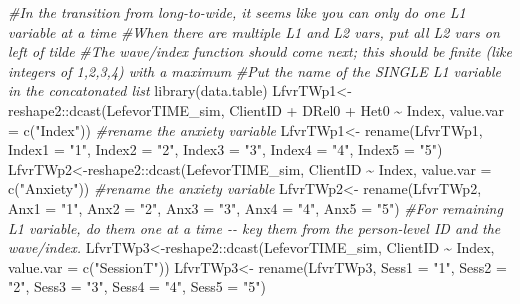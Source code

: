 \documentclass[
  11pt,
]{book}
\newenvironment{Shaded}{\begin{snugshade}}{\end{snugshade}}
\newcommand{\AttributeTok}[1]{\textcolor[rgb]{0.77,0.63,0.00}{#1}}
\newcommand{\CommentTok}[1]{\textcolor[rgb]{0.56,0.35,0.01}{\textit{#1}}}
\newcommand{\FunctionTok}[1]{\textcolor[rgb]{0.00,0.00,0.00}{#1}}
\newcommand{\NormalTok}[1]{#1}
\newcommand{\OtherTok}[1]{\textcolor[rgb]{0.56,0.35,0.01}{#1}}
\newcommand{\SpecialCharTok}[1]{\textcolor[rgb]{0.00,0.00,0.00}{#1}}
\newcommand{\StringTok}[1]{\textcolor[rgb]{0.31,0.60,0.02}{#1}}
\begin{document}
\begin{Shaded}
\begin{Highlighting}[]
\CommentTok{\#In the transition from long{-}to{-}wide, it seems like you can only do one L1 variable at a time}
\CommentTok{\#When there are multiple L1 and L2 vars, put all L2 vars on left of tilde}
\CommentTok{\#The wave/index function should come next; this should be finite (like integers of 1,2,3,4) with a maximum}
\CommentTok{\#Put the name of the SINGLE L1 variable in the concatonated list}
\FunctionTok{library}\NormalTok{(data.table)}
\NormalTok{LfvrTWp1}\OtherTok{\textless{}{-}}\NormalTok{reshape2}\SpecialCharTok{::}\FunctionTok{dcast}\NormalTok{(LefevorTIME\_sim, ClientID }\SpecialCharTok{+}\NormalTok{ DRel0 }\SpecialCharTok{+}\NormalTok{ Het0 }\SpecialCharTok{\textasciitilde{}}\NormalTok{ Index, }\AttributeTok{value.var =} \FunctionTok{c}\NormalTok{(}\StringTok{"Index"}\NormalTok{))}
\CommentTok{\#rename the anxiety variable}
\NormalTok{LfvrTWp1}\OtherTok{\textless{}{-}}  \FunctionTok{rename}\NormalTok{(LfvrTWp1, }\AttributeTok{Index1 =} \StringTok{"1"}\NormalTok{, }\AttributeTok{Index2 =} \StringTok{"2"}\NormalTok{, }\AttributeTok{Index3 =} \StringTok{"3"}\NormalTok{, }\AttributeTok{Index4 =} \StringTok{"4"}\NormalTok{, }\AttributeTok{Index5 =} \StringTok{"5"}\NormalTok{)}
\NormalTok{LfvrTWp2}\OtherTok{\textless{}{-}}\NormalTok{reshape2}\SpecialCharTok{::}\FunctionTok{dcast}\NormalTok{(LefevorTIME\_sim, ClientID }\SpecialCharTok{\textasciitilde{}}\NormalTok{ Index, }\AttributeTok{value.var =} \FunctionTok{c}\NormalTok{(}\StringTok{"Anxiety"}\NormalTok{))}
\CommentTok{\#rename the anxiety variable}
\NormalTok{LfvrTWp2}\OtherTok{\textless{}{-}}  \FunctionTok{rename}\NormalTok{(LfvrTWp2, }\AttributeTok{Anx1 =} \StringTok{"1"}\NormalTok{, }\AttributeTok{Anx2 =} \StringTok{"2"}\NormalTok{, }\AttributeTok{Anx3 =} \StringTok{"3"}\NormalTok{, }\AttributeTok{Anx4 =} \StringTok{"4"}\NormalTok{, }\AttributeTok{Anx5 =} \StringTok{"5"}\NormalTok{)}
\CommentTok{\#For remaining L1 variable, do them one at a time {-}{-} key them from the person{-}level ID and the wave/index.}
\NormalTok{LfvrTWp3}\OtherTok{\textless{}{-}}\NormalTok{reshape2}\SpecialCharTok{::}\FunctionTok{dcast}\NormalTok{(LefevorTIME\_sim, ClientID }\SpecialCharTok{\textasciitilde{}}\NormalTok{ Index, }\AttributeTok{value.var =} \FunctionTok{c}\NormalTok{(}\StringTok{"SessionT"}\NormalTok{))}
\NormalTok{LfvrTWp3}\OtherTok{\textless{}{-}}  \FunctionTok{rename}\NormalTok{(LfvrTWp3, }\AttributeTok{Sess1 =} \StringTok{"1"}\NormalTok{, }\AttributeTok{Sess2 =} \StringTok{"2"}\NormalTok{, }\AttributeTok{Sess3 =} \StringTok{"3"}\NormalTok{, }\AttributeTok{Sess4 =} \StringTok{"4"}\NormalTok{, }\AttributeTok{Sess5 =} \StringTok{"5"}\NormalTok{)}

\end{Highlighting}
\end{Shaded}
\end{document}

